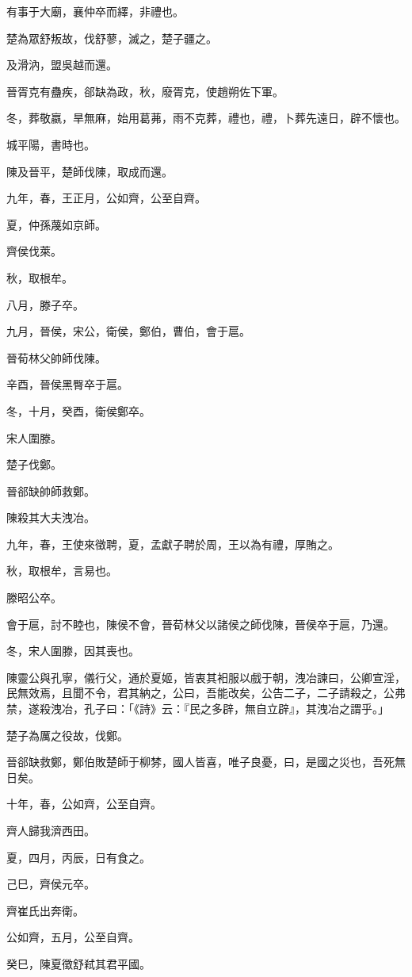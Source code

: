 \begin{pinyinscope}
有事于大廟，襄仲卒而繹，非禮也。

楚為眾舒叛故，伐舒蓼，滅之，楚子疆之。

及滑汭，盟吳越而還。

晉胥克有蠱疾，郤缺為政，秋，廢胥克，使趙朔佐下軍。

冬，葬敬嬴，旱無麻，始用葛茀，雨不克葬，禮也，禮，卜葬先遠日，辟不懷也。

城平陽，書時也。

陳及晉平，楚師伐陳，取成而還。

九年，春，王正月，公如齊，公至自齊。

夏，仲孫蔑如京師。

齊侯伐萊。

秋，取根牟。

八月，滕子卒。

九月，晉侯，宋公，衛侯，鄭伯，曹伯，會于扈。

晉荀林父帥師伐陳。

辛酉，晉侯黑臀卒于扈。

冬，十月，癸酉，衛侯鄭卒。

宋人圍滕。

楚子伐鄭。

晉郤缺帥師救鄭。

陳殺其大夫洩冶。

九年，春，王使來徵聘，夏，孟獻子聘於周，王以為有禮，厚賄之。

秋，取根牟，言易也。

滕昭公卒。

會于扈，討不睦也，陳侯不會，晉荀林父以諸侯之師伐陳，晉侯卒于扈，乃還。

冬，宋人圍滕，因其喪也。

陳靈公與孔寧，儀行父，通於夏姬，皆衷其衵服以戲于朝，洩冶諫曰，公卿宣淫，民無效焉，且聞不令，君其納之，公曰，吾能改矣，公告二子，二子請殺之，公弗禁，遂殺洩冶，孔子曰：「《詩》云：『民之多辟，無自立辟』，其洩冶之謂乎。」

楚子為厲之役故，伐鄭。

晉郤缺救鄭，鄭伯敗楚師于柳棼，國人皆喜，唯子良憂，曰，是國之災也，吾死無日矣。

十年，春，公如齊，公至自齊。

齊人歸我濟西田。

夏，四月，丙辰，日有食之。

己巳，齊侯元卒。

齊崔氏出奔衛。

公如齊，五月，公至自齊。

癸巳，陳夏徵舒弒其君平國。


\end{pinyinscope}
